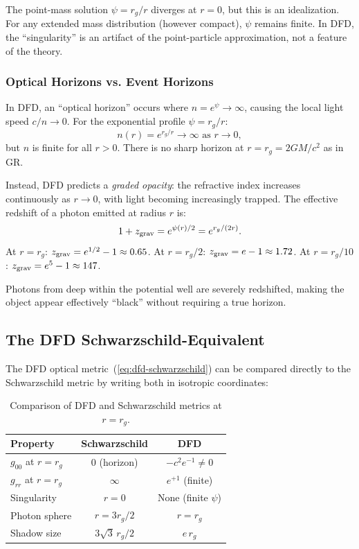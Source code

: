 \documentclass[aps,prd,twocolumn,superscriptaddress,nofootinbib]{revtex4-2}
\begin{document}
The point-mass solution $\psi = r_g/r$ diverges at $r = 0$,
but this is an idealization. For any extended mass distribution
(however compact), $\psi$ remains finite. In DFD, the
``singularity'' is an artifact of the point-particle
approximation, not a feature of the theory.

\subsubsection{Optical Horizons vs. Event Horizons}

In DFD, an ``optical horizon'' occurs where $n = e^\psi \to \infty$,
causing the local light speed $c/n \to 0$. For the exponential
profile $\psi = r_g/r$:
\begin{equation}
n(r) = e^{r_g/r} \to \infty \text{ as } r \to 0,
\end{equation}
but $n$ is finite for all $r > 0$. There is no sharp horizon at
$r = r_g = 2GM/c^2$ as in GR.

Instead, DFD predicts a \textit{graded opacity}: the refractive
index increases continuously as $r \to 0$, with light becoming
increasingly trapped. The effective redshift of a photon emitted
at radius $r$ is:
\begin{equation}
1 + z_{\rm grav} = e^{\psi(r)/2} = e^{r_g/(2r)}.
\end{equation}
At $r = r_g$: $z_{\rm grav} = e^{1/2} - 1 \approx 0.65$.
At $r = r_g/2$: $z_{\rm grav} = e - 1 \approx 1.72$.
At $r = r_g/10$: $z_{\rm grav} = e^5 - 1 \approx 147$.

Photons from deep within the potential well are severely
redshifted, making the object appear effectively ``black''
without requiring a true horizon.

\subsection{The DFD Schwarzschild-Equivalent}\label{sec:dfd-schwarzschild}

The DFD optical metric~(\ref{eq:dfd-schwarzschild}) can be
compared directly to the Schwarzschild metric by writing both
in isotropic coordinates:

\begin{table}[h]
\centering
\caption{Comparison of DFD and Schwarzschild metrics at $r = r_g$.}
\label{tab:metric-comparison}
\begin{tabular}{lcc}
\toprule
Property & Schwarzschild & DFD \\
\midrule
$g_{00}$ at $r = r_g$ & 0 (horizon) & $-c^2 e^{-1} \neq 0$ \\
$g_{rr}$ at $r = r_g$ & $\infty$ & $e^{+1}$ (finite) \\
Singularity & $r = 0$ & None (finite $\psi$) \\
Photon sphere & $r = 3r_g/2$ & $r = r_g$ \\
Shadow size & $3\sqrt{3}\,r_g/2$ & $e\,r_g$ \\
\bottomrule
\end{tabular}
\end{table}
\end{document}
